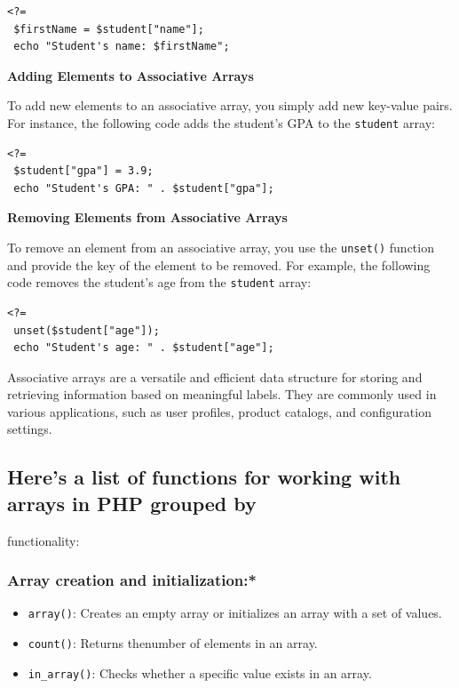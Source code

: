 \documentclass[11pt]{article}
\begin{document}
\begin{verbatim}
<?=
 $firstName = $student["name"];
 echo "Student's name: $firstName";
\end{verbatim}

\textbf{Adding Elements to Associative Arrays}

To add new elements to an associative array, you simply add new
key-value pairs. For instance, the following code adds the student's GPA
to the \texttt{student} array:

\begin{verbatim}
<?=
 $student["gpa"] = 3.9;
 echo "Student's GPA: " . $student["gpa"];
\end{verbatim}

\textbf{Removing Elements from Associative Arrays}

To remove an element from an associative array, you use the \texttt{unset()}
function and provide the key of the element to be removed. For example,
the following code removes the student's age from the \texttt{student} array:

\begin{verbatim}
<?=
 unset($student["age"]);
 echo "Student's age: " . $student["age"];
\end{verbatim}

Associative arrays are a versatile and efficient data structure for
storing and retrieving information based on meaningful labels. They are
commonly used in various applications, such as user profiles, product
catalogs, and configuration settings.

\subsection{Here's a list of functions for working with arrays in PHP grouped by}
\label{sec:org0ea5afb}
functionality:

\subsubsection{Array creation and initialization:*}
\label{sec:orgd30115d}
\begin{itemize}
\item \texttt{array()}: Creates an empty array or initializes an array with a set
of values.
\item \texttt{count()}: Returns thenumber of elements in an array.
\item \texttt{in\_array()}: Checks whether a specific value exists in an array.
\end{itemize}
\end{document}

